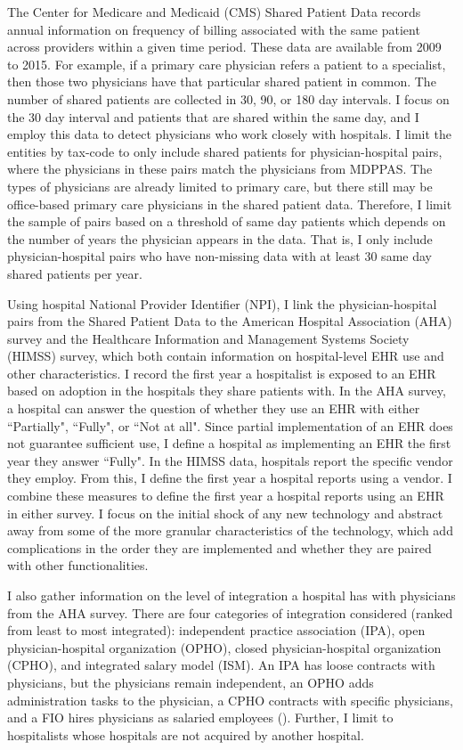 \documentclass[12pt]{article}
\begin{document}
The Center for Medicare and Medicaid (CMS) Shared Patient Data records annual information on frequency of billing associated with the same patient across providers within a given time period. These data are available from 2009 to 2015. For example, if a primary care physician refers a patient to a specialist, then those two physicians have that particular shared patient in common. The number of shared patients are collected in 30, 90, or 180 day intervals. I focus on the 30 day interval and patients that are shared within the same day, and I employ this data to detect physicians who work closely with hospitals. I limit the entities by tax-code to only include shared patients for physician-hospital pairs, where the physicians in these pairs match the physicians from MDPPAS. The types of physicians are already limited to primary care, but there still may be office-based primary care physicians in the shared patient data. Therefore, I limit the sample of pairs based on a threshold of same day patients which depends on the number of years the physician appears in the data. That is, I only include physician-hospital pairs who have non-missing data with at least 30 same day shared patients per year.


Using hospital National Provider Identifier (NPI), I link the physician-hospital pairs from the Shared Patient Data to the American Hospital Association (AHA) survey and the Healthcare Information and Management Systems Society (HIMSS) survey, which both contain information on hospital-level EHR use and other characteristics. I record the first year a hospitalist is exposed to an EHR based on adoption in the hospitals they share patients with. In the AHA survey, a hospital can answer the question of whether they use an EHR with either ``Partially", ``Fully", or ``Not at all". Since partial implementation of an EHR does not guarantee sufficient use, I define a hospital as implementing an EHR the first year they answer ``Fully". In the HIMSS data, hospitals report the specific vendor they employ. From this, I define the first year a hospital reports using a vendor. I combine these measures to define the first year a hospital reports using an EHR in either survey. I focus on the initial shock of any new technology and abstract away from some of the more granular characteristics of the technology, which add complications in the order they are implemented and whether they are paired with other functionalities.

I also gather information on the level of integration a hospital has with physicians from the AHA survey. There are four categories of integration considered (ranked from least to most integrated): independent practice association (IPA), open physician-hospital organization (OPHO), closed physician-hospital organization (CPHO), and integrated salary model (ISM). An IPA has loose contracts with physicians, but the physicians remain independent, an OPHO adds administration tasks to the physician, a CPHO contracts with specific physicians, and a FIO hires physicians as salaried employees (\cite{short2017integration}). Further, I limit to hospitalists whose hospitals are not acquired by another hospital.
\end{document}

